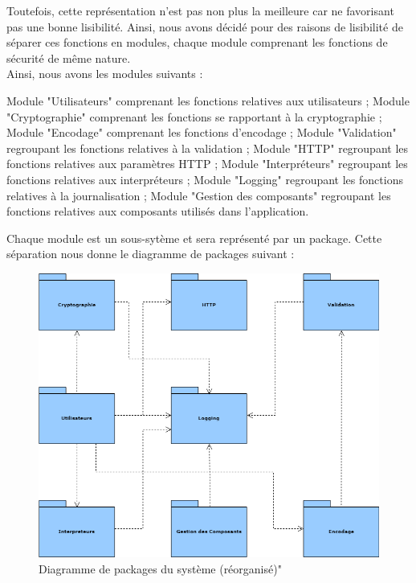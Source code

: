 Toutefois, cette représentation n'est pas non plus la meilleure car ne favorisant pas une bonne lisibilité. Ainsi, nous avons décidé pour des raisons de lisibilité de séparer ces fonctions en modules, chaque module comprenant les fonctions de sécurité de même nature.\\
Ainsi, nous avons les modules suivants :
\begin{itemize}
	\itemcheck Module "Utilisateurs" comprenant les fonctions relatives aux utilisateurs ;
	\itemcheck Module "Cryptographie" comprenant les fonctions se rapportant à la cryptographie ; 
	\itemcheck Module "Encodage" comprenant les fonctions d'encodage ; 
	\itemcheck Module "Validation" regroupant les fonctions relatives à la validation ; 
	\itemcheck Module "HTTP" regroupant les fonctions relatives aux paramètres HTTP ;
	\itemcheck Module "Interpréteurs" regroupant les fonctions relatives aux interpréteurs ;
	\itemcheck Module "Logging" regroupant les fonctions relatives à la journalisation ; 
	\itemcheck Module "Gestion des composants" regroupant les fonctions relatives aux composants utilisés dans l'application.
\end{itemize}
Chaque module est un sous-sytème et sera représenté par un package. Cette séparation nous donne le diagramme de packages suivant :
\begin{figure}[H]
	\centering
	\includegraphics[height=0.5\textheight]{fig/S-Package-diagram.png}
	\caption{Diagramme de packages du système (réorganisé)"}
\end{figure}


